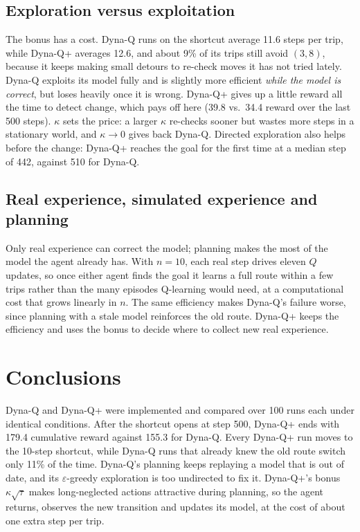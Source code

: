 \documentclass[11pt]{article}
\begin{document}
\subsection{Exploration versus exploitation}
The bonus has a cost. Dyna-Q runs on the shortcut average 11.6 steps per trip, while Dyna-Q+
averages 12.6, and about 9\% of its trips still avoid $(3,8)$, because it keeps making small
detours to re-check moves it has not tried lately. Dyna-Q exploits its model fully and is
slightly more efficient \emph{while the model is correct}, but loses heavily once it is wrong.
Dyna-Q+ gives up a little reward all the time to detect change, which pays off here (39.8 vs.\
34.4 reward over the last 500 steps). $\kappa$ sets the price: a larger $\kappa$ re-checks sooner
but wastes more steps in a stationary world, and $\kappa \to 0$ gives back Dyna-Q. Directed
exploration also helps before the change: Dyna-Q+ reaches the goal for the first time at a median
step of 442, against 510 for Dyna-Q.

\subsection{Real experience, simulated experience and planning}
Only real experience can correct the model; planning makes the most of the model the agent
already has. With $n = 10$, each real step drives eleven $Q$ updates, so once either agent finds
the goal it learns a full route within a few trips rather than the many episodes Q-learning would
need, at a computational cost that grows linearly in $n$. The same efficiency makes Dyna-Q's
failure worse, since planning with a stale model reinforces the old route. Dyna-Q+ keeps the
efficiency and uses the bonus to decide where to collect new real experience.

\section{Conclusions}
Dyna-Q and Dyna-Q+ were implemented and compared over 100 runs each under identical
conditions. After the shortcut opens at step 500, Dyna-Q+ ends with 179.4 cumulative reward
against 155.3 for Dyna-Q. Every Dyna-Q+ run moves to the 10-step shortcut, while Dyna-Q runs
that already knew the old route switch only 11\% of the time. Dyna-Q's planning keeps replaying a
model that is out of date, and its $\varepsilon$-greedy exploration is too undirected to fix it.
Dyna-Q+'s bonus $\kappa\sqrt{\tau}$ makes long-neglected actions attractive during planning, so
the agent returns, observes the new transition and updates its model, at the cost of about one
extra step per trip.
\end{document}
